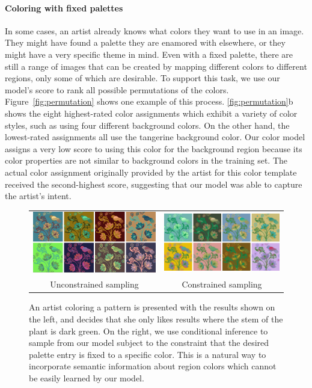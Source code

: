 \paragraph{Coloring with fixed palettes} In some cases, an artist already knows what colors they want to use in an image. They might have found a palette they are enamored with elsewhere, or they might have a very specific theme in mind. Even with a fixed palette, there are still a range of images that can be created by mapping different colors to different regions, only some of which are desirable. To support this task, we use our model's score to rank all possible permutations of the colors. Figure~\ref{fig:permutation} shows one example of this process. \ref{fig:permutation}b shows the eight highest-rated color assignments which exhibit a variety of color styles, such as using four different background colors. On the other hand, the lowest-rated assignments all use the tangerine background color. Our color model assigns a very low score to using this color for the background region because its color properties are not similar to background colors in the training set. The actual color assignment originally provided by the artist for this color template received the second-highest score, suggesting that our model was able to capture the artist's intent.

\begin{figure}[ht]
\begin{tabular}{cc} 
\includegraphics[width=.475\linewidth]{figs/constrainedSearchUnconstrained}&\includegraphics[width=.475\linewidth]{figs/constrainedSearchConstrained}\\
Unconstrained sampling&Constrained sampling\\
\end{tabular}

\caption{An artist coloring a pattern is presented with the results shown on the left, and decides that she only likes results where the stem of the plant is dark green. On the right, we use conditional inference to sample from our model subject to the constraint that the desired palette entry is fixed to a specific color. This is a natural way to incorporate semantic information about region colors which cannot be easily learned by our model.}
\label{fig:constrainedInference}
\vspace{-1.0em}
\end{figure}

